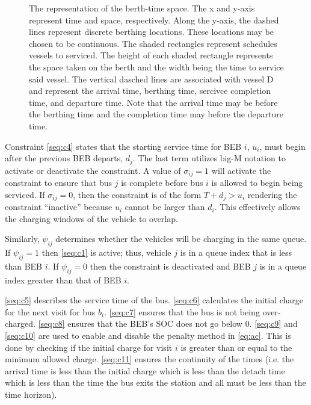 \documentclass[11pt,a4paper,final]{article}
\begin{document}
\begin{figure}[ht!]
{{
  }}
  \caption{The representation of the berth-time space. The x and y-axis represent time and space, respectively. Along the y-axis, the dashed lines represent discrete berthing locations. These locations may be chosen to be continuous. The shaded rectangles represent schedules vessels to serviced. The height of each shaded rectangle represents the space taken on the berth and the width being the time to service said vessel. The vertical dasched lines are associated with vessel D and represent the arrival time, berthing time, sercivce completion time, and departure time. Note that the arrival time may be before the berthing time and the completion time may before the departure time.}
  \label{fig:spacial-and-temporal-constr}
\end{figure}

Constraint \ref{seq:c4} states that the starting service time for BEB \(i\), \(u_i\), must begin after the previous BEB
departs, \(d_j\). The last term utilizes big-M notation to activate or deactivate the constraint. A value of \(\sigma_{ij} = 1\)
will activate the constraint to ensure that bus \(j\) is complete before bus \(i\) is allowed to begin being serviced. If
\(\sigma_{ij} = 0\), then the constraint is of the form \(T + d_j > u_i\) rendering the constraint ``inactive'' because \(u_i\)
cannot be larger than \(d_i\). This effectively allows the charging windows of the vehicle to overlap.

Similarly, \(\psi_{ij}\) determines whether the vehicles will be charging in the same queue. If \(\psi_{ij} = 1\) then
\eqref{seq:c1} is active; thus, vehicle \(j\) is in a queue index that is less than BEB \(i\). If \(\psi_{ij} = 0\) then the
constraint is deactivated and BEB \(j\) is in a queue index greater than that of BEB \(i\).

\ref{seq:c5} describes the service time of the bus. \ref{seq:c6} calculates the initial charge for the next visit for
bus \(b_i\). \ref{seq:c7} ensures that the bus is not being over-charged. \ref{seq:c8} ensures that the BEB's SOC does not
go below 0. \ref{seq:c9} and \ref{seq:c10} are used to enable and disable the penalty method in \ref{eq:ac}. This is done by
checking if the initial charge for visit \(i\) is greater than or equal to the minimum allowed charge. \ref{seq:c11}
ensures the continuity of the times (i.e. the arrival time is less than the initial charge which is less than the detach
time which is less than the time the bus exits the station and all must be less than the time horizon).
\end{document}
